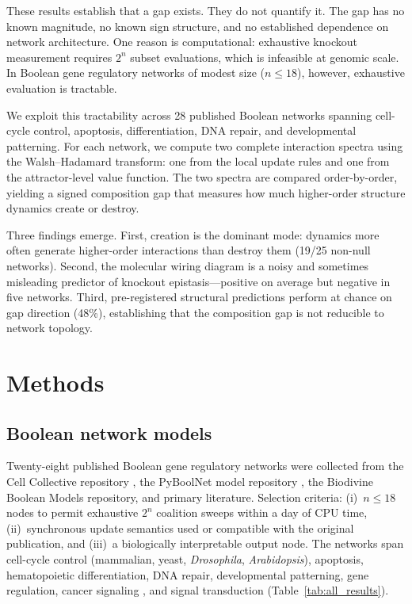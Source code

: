 \documentclass[10pt]{article}
\begin{document}
These results establish that a gap exists. They do not quantify it.
The gap has no known magnitude, no known sign structure, and no
established dependence on network architecture. One reason is
computational: exhaustive knockout measurement requires $2^n$ subset
evaluations, which is infeasible at genomic scale. In Boolean gene
regulatory networks of modest size ($n \leq 18$), however, exhaustive
evaluation is tractable.

We exploit this tractability across 28 published Boolean networks
spanning cell-cycle control, apoptosis, differentiation, DNA repair,
and developmental patterning. For each network, we compute two
complete interaction spectra using the Walsh--Hadamard transform: one
from the local update rules and one from the attractor-level value
function. The two spectra are compared order-by-order, yielding a
signed composition gap that measures how much higher-order structure
dynamics create or destroy.

Three findings emerge. First, creation is the dominant mode: dynamics
more often generate higher-order interactions than destroy them (19/25
non-null networks). Second, the molecular wiring diagram is a noisy
and sometimes misleading predictor of knockout epistasis---positive on
average but negative in five networks. Third, pre-registered
structural predictions perform at chance on gap direction (48\%),
establishing that the composition gap is not reducible to network
topology.


\section{Methods}
\label{sec:methods}

\subsection{Boolean network models}
\label{sec:models}

Twenty-eight published Boolean gene regulatory networks were collected
from the Cell Collective repository \citep{helikar2012cell}, the
PyBoolNet model repository \citep{klarner2017pyboolnet}, the Biodivine
Boolean Models repository, and primary literature. Selection criteria:
(i)~$n \leq 18$ nodes to permit exhaustive $2^n$ coalition sweeps
within a day of CPU time, (ii)~synchronous update semantics used or
compatible with the original publication, and (iii)~a biologically
interpretable output node. The networks span cell-cycle control
(mammalian, yeast, \emph{Drosophila}, \emph{Arabidopsis}), apoptosis,
hematopoietic differentiation, DNA repair, developmental patterning,
gene regulation, cancer signaling \citep{grieco2013integrative},
and signal transduction (Table~\ref{tab:all_results}).
\end{document}
